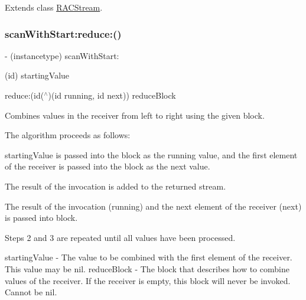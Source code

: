 Extends class \mbox{\hyperlink{interface_r_a_c_stream_aa86990e9bc4cbc3dff2815f56b907b41}{R\+A\+C\+Stream}}.

\mbox{\label{category_r_a_c_stream_07_operations_08_aa86990e9bc4cbc3dff2815f56b907b41}} 
\subsubsection{\texorpdfstring{scan\+With\+Start\+:reduce\+:()}{scanWithStart:reduce:()}\hspace{0.1cm}{\footnotesize\ttfamily [2/3]}}
{\footnotesize\ttfamily -\/ (instancetype) scan\+With\+Start\+: \begin{DoxyParamCaption}\item[{(id)}]{starting\+Value }\item[{reduce:(id($^\wedge$)(id running, id next))}]{reduce\+Block }\end{DoxyParamCaption}}

Combines values in the receiver from left to right using the given block.

The algorithm proceeds as follows\+:


\begin{DoxyEnumerate}
\item {\ttfamily starting\+Value} is passed into the block as the {\ttfamily running} value, and the first element of the receiver is passed into the block as the {\ttfamily next} value.
\item The result of the invocation is added to the returned stream.
\item The result of the invocation ({\ttfamily running}) and the next element of the receiver ({\ttfamily next}) is passed into {\ttfamily block}.
\item Steps 2 and 3 are repeated until all values have been processed.
\end{DoxyEnumerate}

starting\+Value -\/ The value to be combined with the first element of the receiver. This value may be {\ttfamily nil}. reduce\+Block -\/ The block that describes how to combine values of the receiver. If the receiver is empty, this block will never be invoked. Cannot be nil.


